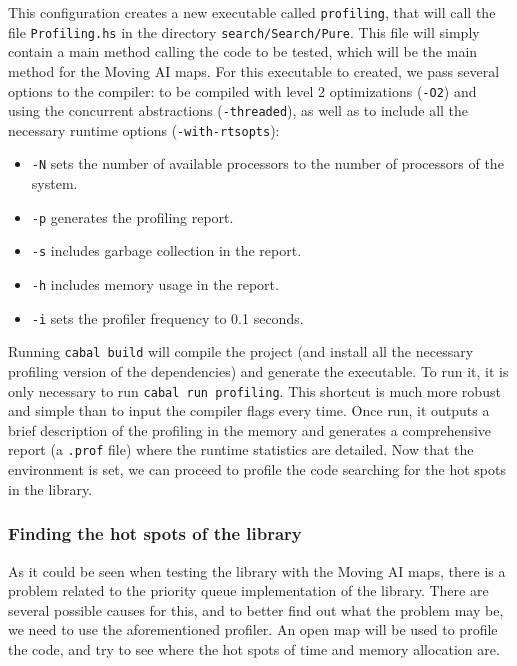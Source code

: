 This configuration creates a new executable called \texttt{profiling}, that
will call the file \texttt{Profiling.hs} in the directory
\texttt{search/Search/Pure}. This file will simply contain a main method
calling the code to be tested, which will be the main method for the Moving AI
maps. For this executable to created, we pass several options to the compiler:
to be compiled with level 2 optimizations (\texttt{-O2}) and using the
concurrent abstractions (\texttt{-threaded}), as well as to include all the
necessary runtime options (\texttt{-with-rtsopts}):

\begin{itemize}
\item \texttt{-N} sets the number of available processors to the number of
  processors of the system.
\item \texttt{-p} generates the profiling report.
\item \texttt{-s} includes garbage collection in the report.
\item \texttt{-h} includes memory usage in the report.
\item \texttt{-i} sets the profiler frequency to 0.1 seconds.  
\end{itemize}

Running \texttt{cabal build} will compile the project (and install all the
necessary profiling version of the dependencies) and generate the executable.
To run it, it is only necessary to run \texttt{cabal run profiling}. This
shortcut is much more robust and simple than to input the compiler flags every
time. Once run, it outputs a brief description of the profiling in the memory
and generates a comprehensive report (a \texttt{.prof} file) where the runtime
statistics are detailed. Now that the environment is set, we can proceed to
profile the code searching for the hot spots in the library.\\


\subsubsection{Finding the hot spots of the library}

As it could be seen when testing the library with the Moving AI maps, there is
a problem related to the priority queue implementation of the library. There
are several possible causes for this, and to better find out what the problem
may be, we need to use the aforementioned profiler. An open map will be used to
profile the code, and try to see where the hot spots of time and memory
allocation are.\\

